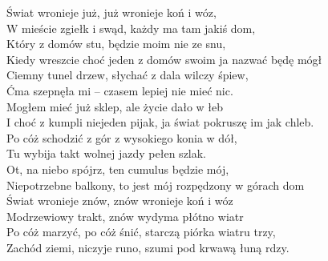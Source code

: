 
\begin{flushleft}
Świat wronieje już, już wronieje koń i wóz,   \tab{}\tab{} \\
W mieście zgiełk i swąd, każdy ma tam jakiś dom,  \tab{} \\
Który z domów stu, będzie moim nie ze snu,  \tab{}\tab{} \\
Kiedy wreszcie choć jeden z domów swoim ja nazwać będę mógł  \\
\vskip 3mm
Ciemny tunel drzew, słychać z dala wilczy śpiew, \\
Ćma szepnęła mi – czasem lepiej nie mieć nic. \\
Mogłem mieć już sklep, ale życie dało w łeb \\
I choć z kumpli niejeden pijak, ja świat pokruszę im jak chleb. \\
\vskip 3mm
Po cóż schodzić z gór z wysokiego konia w dół, \\
Tu wybija takt wolnej jazdy pełen szlak. \\
Ot, na niebo spójrz, ten cumulus będzie mój, \\
Niepotrzebne balkony, to jest mój rozpędzony w górach dom \\
\vskip 3mm
Świat wronieje znów, znów wronieje koń i wóz \\
Modrzewiowy trakt, znów wydyma płótno wiatr \\
Po cóż marzyć, po cóż śnić, starczą piórka wiatru trzy, \\
Zachód ziemi, niczyje runo, szumi pod krwawą łuną rdzy. \\
\end{flushleft}
\clearpage
